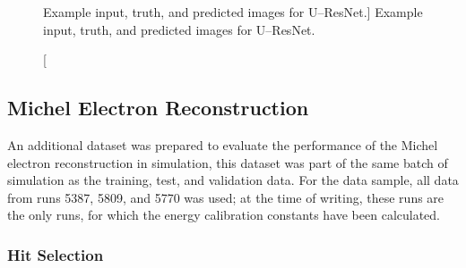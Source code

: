 \begin{figure}
	\caption
	[Example input, truth, and predicted images for U--ResNet.]
	{Example input, truth, and predicted images for U--ResNet.}
	\label{fig:unet_example}
\end{figure}

\subsection{Michel Electron Reconstruction}

An additional dataset was prepared to evaluate the performance of the Michel
electron reconstruction in simulation, this dataset was part of the same batch
of simulation as the training, test, and validation data. For the \protodune{} 
data sample, all data from runs 5387, 5809, and 5770 was used; at the time of 
writing, these runs are the only runs, for which the energy calibration 
constants have been calculated.

\subsubsection{Hit Selection}

